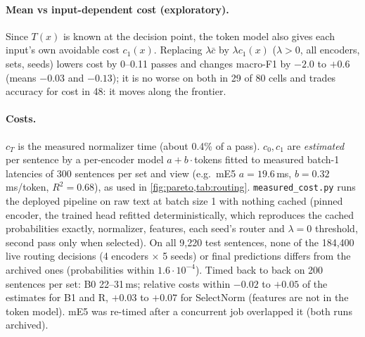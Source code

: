 \paragraph{Mean vs input-dependent cost (exploratory).} Since $T(x)$ is known at the decision point, the token model also gives each input's own avoidable cost $c_1(x)$. Replacing $\lambda\bar c$ by $\lambda c_1(x)$ ($\lambda>0$, all encoders, sets, seeds) lowers cost by 0--0.11 passes and changes macro-F1 by $-2.0$ to $+0.6$ (means $-0.03$ and $-0.13$); it is no worse on both in 29 of 80 cells and trades accuracy for cost in 48: it moves along the frontier.

\paragraph{Costs.} $c_T$ is the measured normalizer time (about 0.4\% of a pass). $c_0,c_1$ are \emph{estimated} per sentence by a per-encoder model $a+b\cdot$tokens fitted to measured batch-1 latencies of 300 sentences per set and view (e.g.\ mE5 $a=19.6$\,ms, $b=0.32$\,ms/token, $R^2=0.68$), as used in \cref{fig:pareto,tab:routing}. \texttt{measured\_cost.py} runs the deployed pipeline on raw text at batch size 1 with nothing cached (pinned encoder, the trained head refitted deterministically, which reproduces the cached probabilities exactly, normalizer, features, each seed's router and $\lambda{=}0$ threshold, second pass only when selected). On all 9{,}220 test sentences, none of the 184{,}400 live routing decisions (4 encoders $\times$ 5 seeds) or final predictions differs from the archived ones (probabilities within $1.6\cdot10^{-4}$). Timed back to back on 200 sentences per set: B0 22--31\,ms; relative costs within $-0.02$ to $+0.05$ of the estimates for B1 and R, $+0.03$ to $+0.07$ for SelectNorm (features are not in the token model). mE5 was re-timed after a concurrent job overlapped it (both runs archived).

